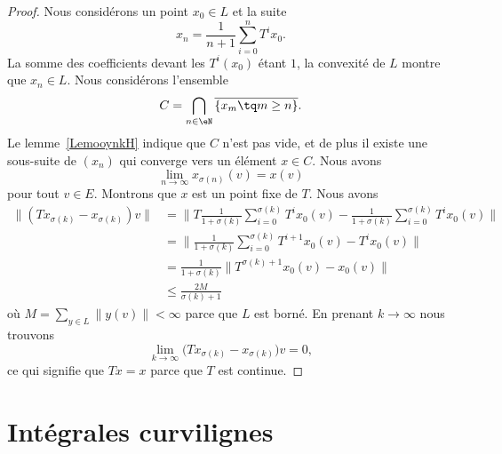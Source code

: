 \begin{proof}
	Nous considérons un point \( x_0\in L\) et la suite
	\begin{equation}
		x_n=\frac{1}{ n+1 }\sum_{i=0}^n T^ix_0.
	\end{equation}
	La somme des coefficients devant les \( T^i(x_0)\) étant \( 1\), la convexité de \( L\) montre que \( x_n\in L\). Nous considérons l'ensemble
	\begin{equation}
		C=\bigcap_{n\in \eN}\overline{ \{ x_m\tq m\geq n \} }.
	\end{equation}
	Le lemme~\ref{LemooynkH} indique que \( C\) n'est pas vide, et de plus il existe une sous-suite de \( (x_n)\) qui converge vers un élément \( x\in C\). Nous avons
	\begin{equation}
		\lim_{n\to \infty} x_{\sigma(n)}(v)=x(v)
	\end{equation}
	pour tout \( v\in E\). Montrons que \( x\) est un point fixe de \( T\). Nous avons
	\begin{subequations}
		\begin{align}
			\| (Tx_{\sigma(k)}-x_{\sigma(k)})v \| & =\Big\| T\frac{1}{ 1+\sigma(k) }\sum_{i=0}^{\sigma(k)}T^ix_0(v)-\frac{1}{ 1+\sigma(k) }\sum_{i=0}^{\sigma(k)}T^ix_0(v) \Big\| \\
			                                      & =\Big\| \frac{1}{ 1+\sigma(k) }\sum_{i=0}^{\sigma(k)}T^{i+1}x_0(v)-T^ix_0(v) \Big\|                                           \\
			                                      & =\frac{1}{ 1+\sigma(k) }\big\| T^{\sigma(k)+1}x_0(v)-x_0(v) \big\|                                                            \\
			                                      & \leq\frac{ 2M }{ \sigma(k)+1 }
		\end{align}
	\end{subequations}
	où \( M=\sum_{y\in L}\| y(v) \|<\infty\) parce que \( L\) est borné. En prenant \( k\to\infty\) nous trouvons
	\begin{equation}
		\lim_{k\to \infty} \big( Tx_{\sigma(k)}-x_{\sigma(k)} \big)v=0,
	\end{equation}
	ce qui signifie que \( Tx=x\) parce que \( T\) est continue.
\end{proof}




\section{Intégrales curvilignes}
\label{secintcurvi}

